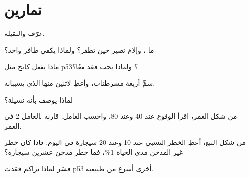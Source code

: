 \section{تمارين}

\begin{exercise}[$\star$]\label{exo:g11:cancer:1}
عرّف   والنقيلة.
\end{exercise}

\begin{exercise}[$\star$]\label{exo:g11:cancer:2}
ما ، وإلامَ تصير حين تطفر؟ ولماذا يكفي 
طافر واحد؟
\end{exercise}

\begin{exercise}[$\star$]\label{exo:g11:cancer:3}
ماذا يفعل  كابح  مثل p53؟ ولماذا يجب فقد  معًا؟
\end{exercise}

\begin{exercise}[$\star$]\label{exo:g11:cancer:4}
سمِّ أربعة مسرطنات، وأعطِ لاثنين منها  الذي يسببانه.
\end{exercise}

\begin{exercise}[$\star$]\label{exo:g11:cancer:5}
لماذا يوصف  بأنه نسيلة؟
\end{exercise}

\begin{exercise}[$\star\star$]\label{exo:g11:cancer:6}
من شكل العمر، اقرأ الوقوع عند 40 وعند 80، واحسب العامل. قارنه بالعامل
2 في العمر.
\end{exercise}

\begin{exercise}[$\star\star$]\label{exo:g11:cancer:7}
من شكل التبغ، أعطِ الخطر النسبي عند 10 وعند 20 سيجارة في اليوم. فإذا
كان خطر غير المدخن مدى الحياة 1\%، فما خطر مدخن عشرين سيجارة؟
\end{exercise}

\begin{exercise}[$\star\star$]\label{exo:g11:cancer:8}
فسّر لماذا تراكم  فقدت p53  أخرى أسرع من  طبيعية.
\end{exercise}


